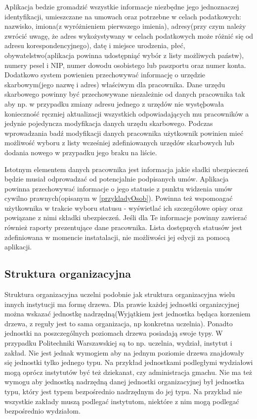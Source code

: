 Aplikacja bedzie gromadzić wszystkie informacje niezbędne jego jednoznaczej identyfikacji, umieszczane na umowach oraz potrzebne w celach podatkowych: nazwisko, imiona(z wyróżnieniem pierwszego imienia), adresy(przy czym należy zwrócić uwagę, że adres wykożystywany w celach podatkowych może różnić się od adresu korespondencyjnego), datę i miejsce urodzenia, płeć, obywatelstwo(aplikacja powinna udostępniąć wybór z listy możliwych państw), numery pesel i NIP, numer dowodu osobistego lub paszportu oraz numer konta. Dodatkowo system powienien przechowywać informację o urzędzie skarbowym(jego nazwę i adres) właściwym dla pracownika. Dane urzędu skarbowego powinny być przechowywane niezależnie od danych pracownika tak aby np. w przypadku zmiany adresu jednego z urzędów nie wystęþowała konieczność ręczniej aktualizacji wszystkich odpowiadających mu pracowników a jedynie pojedyncza modyfikacja danych urzędu skarbowego. Podczas wprowadzania badź modyfikacji danych pracownika użytkownik powinien mieć możliwość wyboru z listy wcześniej zdefiniowanych urzędów skarbowych lub dodania nowego w przypadku jego braku na liście.

Istotnym elementem danych pracownika jest informacja jakie sładki ubezpieczeń będzie musiał odprowadzać od potencjalnie podpisanych umów. Aplikacja powinna przechowywać informacje o jego statusie z punktu widzenia umów cywilno prawnych(opisanym w \ref{przykladyOsob}). Powinna też wspomoagać użytkownika w trakcie wyboru statusu - wyświetlać ich szczegółowe opisy oraz powiązane z nimi składki ubezpieczeń. Jeśli dla Te informacje powinny zawierać również raporty prezentujące dane pracownika. Lista dostępnych statusów jest zdefiniowana w momencie instatalacji, nie możliwości jej edycji za pomocą aplikacji.

\subsection[Struktura organizacyjna][Struktura organizacyjna]{Struktura organizacyjna}
Struktura organizacyjna uczelni podobnie jak struktura organizacyjna wielu innych instytucji ma formę drzewa. Dla prawie każdej jednostki organizcyjnej można wskazać jednostkę nadrzędną(Wyjątkiem jest jednostka będąca korzeniem drzewa, z reguły jest to sama organizacja, np konkretna uczelnia). Ponadto jednostki na poszczególnych poziomach drzewa posiadają swoje typy. W przypadku Politechniki Warszawskiej są to np. uczelnia, wydział, instytut i zakład. Nie jest jednak wymogiem aby na jednym poziomie drzewa znajdowały się jednostki tylko jednego typu. Na przykład jednostkami podległymi wydziałowi mogą oprócz instytutów być też dziekanat, czy administracja gmachu. Nie ma też wymogu aby jednostką nadrzędną danej jednostki organizacyjnej był jednostka typu, który jest typem bezpośrednio nadrzędnym do jej typu. Na przykład nie wszystkie zakłady muszą podlegać instytutom, niektóre z nim mogą podlegać bezpośrednio wydziałom. 

